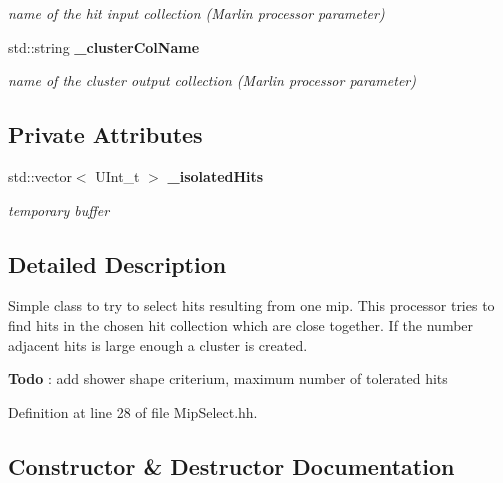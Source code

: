 \begin{DoxyCompactItemize}
\begin{DoxyCompactList}\small\item\em name of the hit input collection (Marlin processor parameter) \item\end{DoxyCompactList}\item 
std::string {\bf \_\-clusterColName}\label{classCALICE_1_1MipSelect_ad9094c81faee001d8cb848cbd0da5ac4}

\begin{DoxyCompactList}\small\item\em name of the cluster output collection (Marlin processor parameter) \item\end{DoxyCompactList}\end{DoxyCompactItemize}
\subsection*{Private Attributes}
\begin{DoxyCompactItemize}
\item 
std::vector$<$ UInt\_\-t $>$ {\bf \_\-isolatedHits}\label{classCALICE_1_1MipSelect_a9e44a652e454927b32108da491368eec}

\begin{DoxyCompactList}\small\item\em temporary buffer \item\end{DoxyCompactList}\end{DoxyCompactItemize}


\subsection{Detailed Description}
Simple class to try to select hits resulting from one mip. This processor tries to find hits in the chosen hit collection which are close together. If the number adjacent hits is large enough a cluster is created. \begin{Desc}
\item[{\bf Todo}]: add shower shape criterium, maximum number of tolerated hits \end{Desc}


Definition at line 28 of file MipSelect.hh.

\subsection{Constructor \& Destructor Documentation}

